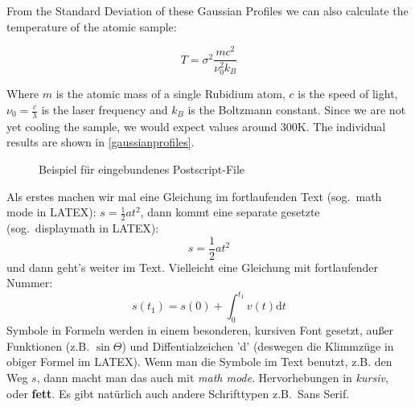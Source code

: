 \documentclass[12pt, a4paper]{article}
\begin{document}
From the Standard Deviation of these Gaussian Profiles we can also calculate the temperature of the atomic sample:

\begin{equation}
T = \sigma^2 \frac{mc^2}{\nu_0^2 k_B}
\end{equation}

Where $m$ is the atomic mass of a single Rubidium atom, $c$ is the speed of light, $\nu_0 = \frac{c}{\lambda}$ is the laser frequency and $k_B$ is the Boltzmann constant. Since we are not yet cooling the sample, we would expect values around $300\si{\kelvin}$. The individual results are shown in \autoref{gaussianprofiles}.










\newpage






















\begin{figure}[h]
  \centering
  \caption{Beispiel f\"ur eingebundenes Postscript-File}
  \label{ps}
\end{figure}

Als erstes machen wir mal eine Gleichung im fortlaufenden Text (sog.\ math mode in LATEX): $s=\frac{1}{2}
a t^2$, dann kommt eine separate gesetzte (sog.\ displaymath in LATEX):
\[         s=\frac{1}{2}a t^2              \]  %
und dann geht's weiter im Text. Vielleicht eine Gleichung mit fortlaufender 
Nummer:
\begin{equation}
 s(t_1)=s(0) + \int_0^{t_1} v(t)\mbox{d}t 
\end{equation}
Symbole in Formeln werden in einem besonderen, kursiven Font
gesetzt, au\ss er Funktionen (z.B. $\sin\Theta$) und Diffentialzeichen 'd' 
(deswegen die Klimmz\"uge in obiger Formel im LATEX). Wenn man die Symbole im
Text benutzt, z.B. den Weg $s$, dann macht man das auch mit {\em math mode}.
Hervorhebungen in {\em kursiv}, oder {\bf fett}. Es gibt nat\"urlich auch 
andere
Schrifttypen z.B.\ {\sf Sans Serif}.
\end{document}
